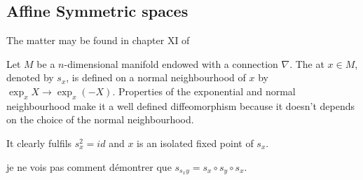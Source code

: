 % 
% 
% 


\subsection{Affine Symmetric spaces}

The matter may be found in chapter XI of \cite{kobayashi2}

Let $M$ be a $n$-dimensional manifold endowed with a connection $\nabla$. The  at $x\in M$, denoted by $s_x$, is defined on a normal neighbourhood of $x$ by $\exp_x X\to\exp_x(-X)$. Properties of the exponential and normal neighbourhood make it a well defined diffeomorphism because it doesn't depends on the choice of the normal neighbourhood.

It clearly fulfils $s_x^2=id$ and $x$ is an isolated fixed point of $s_x$.

\begin{probleme}
je ne vois pas comment démontrer que $s_{s_xy}=s_x\circ s_y\circ s_x$.
\end{probleme}

